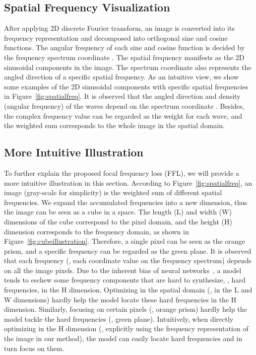 \documentclass[10pt,twocolumn,letterpaper]{article}
\begin{document}
\subsection{Spatial Frequency Visualization}
\label{sec:spatialfreqvis}
After applying 2D discrete Fourier transform, an image is converted into its frequency representation and decomposed into orthogonal sine and cosine functions.
The angular frequency of each sine and cosine function is decided by the frequency spectrum coordinate .
The spatial frequency manifests as the 2D sinusoidal components in the image.
The spectrum coordinate also represents the angled direction of a specific spatial frequency.
As an intuitive view, we show some examples of the 2D sinusoidal components with specific spatial frequencies in Figure~\ref{fig:spatialfreq}.
It is observed that the angled direction and density (angular frequency) of the waves depend on the spectrum coordinate .
Besides, the complex frequency value  can be regarded as the weight for each wave, and the weighted sum corresponds to the whole image in the spatial domain.



\subsection{More Intuitive Illustration}
\label{sec:intuitiveunders}
To further explain the proposed focal frequency loss (FFL), we will provide a more intuitive illustration in this section.
According to Figure~\ref{fig:spatialfreq}, an image (gray-scale for simplicity) is the weighted sum of different spatial frequencies. We expand the accumulated frequencies into a new dimension, thus the image can be seen as a cube in a space. The length (L) and width (W) dimensions of the cube correspond to the pixel domain, and the height (H) dimension corresponds to the frequency domain, as shown in Figure~\ref{fig:cubeillustration}. Therefore, a single pixel can be seen as the orange prism, and a specific frequency can be regarded as the green plane.
It is observed that each frequency (\ie, each coordinate value on the frequency spectrum) depends on all the image pixels. Due to the inherent bias of neural networks~\cite{spectralbias,fprinciple}, a model tends to eschew some frequency components that are hard to synthesize, \ie, hard frequencies, in the H dimension. Optimizing in the spatial domain (\ie, in the L and W dimensions) hardly help the model locate these hard frequencies in the H dimension. Similarly, focusing on certain pixels (\eg, orange prism) hardly help the model tackle the hard frequencies (\eg, green plane). Intuitively, when directly optimizing in the H dimension (\ie, explicitly using the frequency representation of the image in our method), the model can easily locate hard frequencies and in turn focus on them.
\end{document}
